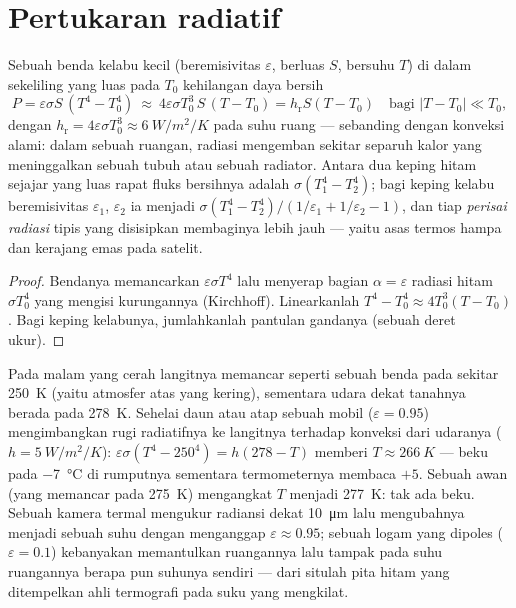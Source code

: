 \section{Pertukaran radiatif}

\begin{proposition}\label{prop:b2:thermal-radiation:exchange}
Sebuah benda kelabu kecil (beremisivitas $\varepsilon$, berluas $S$, bersuhu $T$)
di dalam sekeliling yang luas pada $T_0$ kehilangan daya bersih
\[
P = \varepsilon\sigma S\,(T^4 - T_0^4)
\ \approx\ 4\varepsilon\sigma T_0^3\,S\,(T - T_0) = h_{\text{r}}S(T - T_0)
\quad\text{bagi } |T - T_0| \ll T_0 ,
\]
dengan $h_{\text{r}} = 4\varepsilon\sigma T_0^3 \approx \qty{6}{W/m^2/K}$ pada
suhu ruang --- sebanding dengan konveksi alami: dalam sebuah ruangan,
radiasi mengemban sekitar separuh kalor yang meninggalkan sebuah tubuh atau sebuah radiator.
Antara dua keping hitam sejajar yang luas rapat fluks bersihnya adalah
$\sigma(T_1^4 - T_2^4)$; bagi keping kelabu beremisivitas $\varepsilon_1$,
$\varepsilon_2$ ia menjadi $\sigma(T_1^4 - T_2^4)/(1/\varepsilon_1 + 1/\varepsilon_2
- 1)$, dan tiap \emph{perisai radiasi} tipis yang disisipkan membaginya
lebih jauh --- yaitu asas termos hampa dan kerajang emas pada
satelit.
\end{proposition}

\begin{proof}
Bendanya memancarkan $\varepsilon\sigma T^4$ lalu menyerap bagian $\alpha =
\varepsilon$ radiasi hitam $\sigma T_0^4$ yang mengisi kurungannya
(Kirchhoff). Linearkanlah $T^4 - T_0^4 \approx 4T_0^3(T - T_0)$. Bagi
keping kelabunya, jumlahkanlah pantulan gandanya (sebuah deret ukur).
\end{proof}

\begin{example}\label{ex:b2:thermal-radiation:frost}
Pada malam yang cerah langitnya memancar seperti sebuah benda pada sekitar \qty{250}{K}
(yaitu atmosfer atas yang kering), sementara udara dekat tanahnya berada pada
\qty{278}{K}. Sehelai daun atau atap sebuah mobil ($\varepsilon = 0.95$) mengimbangkan
rugi radiatifnya ke langitnya terhadap konveksi dari udaranya ($h =
\qty{5}{W/m^2/K}$): $\varepsilon\sigma(T^4 - 250^4) = h(278 - T)$ memberi $T
\approx \qty{266}{K}$ --- beku pada \qty{-7}{\celsius} di rumputnya sementara
termometernya membaca $+5$. Sebuah awan (yang memancar pada \qty{275}{K}) mengangkat $T$
menjadi \qty{277}{K}: tak ada beku. Sebuah kamera termal mengukur radiansi dekat
\qty{10}{\micro m} lalu mengubahnya menjadi sebuah suhu dengan menganggap
$\varepsilon \approx 0.95$; sebuah logam yang dipoles ($\varepsilon = 0.1$) kebanyakan
memantulkan ruangannya lalu tampak pada suhu ruangannya berapa pun suhunya
sendiri --- dari situlah pita hitam yang ditempelkan ahli termografi pada suku yang mengkilat.
\end{example}

